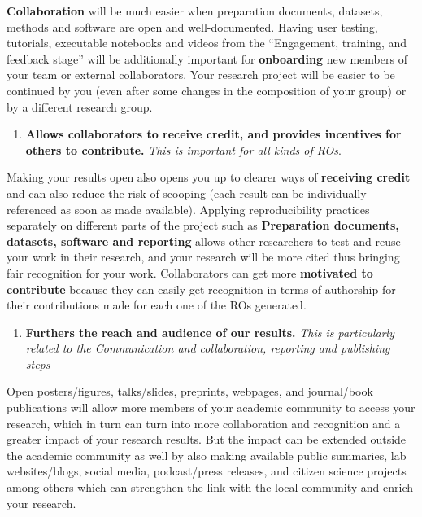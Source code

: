 \documentclass[
  letterpaper,
  DIV=11,
  numbers=noendperiod]{scrreport}
\providecommand{\tightlist}{%
  \setlength{\itemsep}{0pt}\setlength{\parskip}{0pt}}\usepackage{longtable,booktabs,array}
\begin{document}
\textbf{Collaboration} will be much easier when preparation documents,
datasets, methods and software are open and well-documented. Having user
testing, tutorials, executable notebooks and videos from the
``Engagement, training, and feedback stage'' will be additionally
important for \textbf{onboarding} new members of your team or external
collaborators. Your research project will be easier to be continued by
you (even after some changes in the composition of your group) or by a
different research group.

\begin{enumerate}
\def\labelenumi{\arabic{enumi}.}
\tightlist
\item
  \textbf{Allows collaborators to receive credit, and provides
  incentives for others to contribute.} \emph{This is important for all
  kinds of ROs}.
\end{enumerate}

Making your results open also opens you up to clearer ways of
\textbf{receiving credit} and can also reduce the risk of scooping (each
result can be individually referenced as soon as made available).
Applying reproducibility practices separately on different parts of the
project such as \textbf{Preparation documents, datasets, software and
reporting} allows other researchers to test and reuse your work in their
research, and your research will be more cited thus bringing fair
recognition for your work. Collaborators can get more \textbf{motivated
to contribute} because they can easily get recognition in terms of
authorship for their contributions made for each one of the ROs
generated.

\begin{enumerate}
\def\labelenumi{\arabic{enumi}.}
\tightlist
\item
  \textbf{Furthers the reach and audience of our results.} \emph{This is
  particularly related to the Communication and collaboration, reporting
  and publishing steps}
\end{enumerate}

Open posters/figures, talks/slides, preprints, webpages, and
journal/book publications will allow more members of your academic
community to access your research, which in turn can turn into more
collaboration and recognition and a greater impact of your research
results. But the impact can be extended outside the academic community
as well by also making available public summaries, lab websites/blogs,
social media, podcast/press releases, and citizen science projects among
others which can strengthen the link with the local community and enrich
your research.
\end{document}
